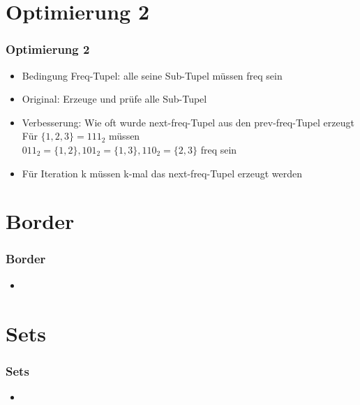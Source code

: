 \documentclass{beamer}
\begin{document}
\section{Optimierung 2}
\begin{frame} %
	\frametitle{Optimierung 2} %
		\begin{itemize}
			\item Bedingung Freq-Tupel: alle seine Sub-Tupel müssen freq sein
			\item Original: Erzeuge und prüfe alle Sub-Tupel 
			\item Verbesserung: Wie oft wurde next-freq-Tupel aus den prev-freq-Tupel erzeugt\\
				\hspace{0.7cm}Für $\{1,2,3\} = 111_2$ müssen \\
				\hspace{0.7cm}${011_2=\{1,2\}, 101_2=\{1,3\}, 110_2=\{2,3\}}$ freq sein
				\hspace{0.7cm} 
			\item Für Iteration k müssen k-mal das next-freq-Tupel erzeugt werden
		\end{itemize}
\end{frame}


\section{Border}
\begin{frame} %
	\frametitle{Border} %
		\begin{itemize}
			\item 
		\end{itemize}
\end{frame}

\section{Sets}
\begin{frame} %
	\frametitle{Sets} %
		\begin{itemize}
			\item 
		\end{itemize}
\end{frame}
\end{document}
